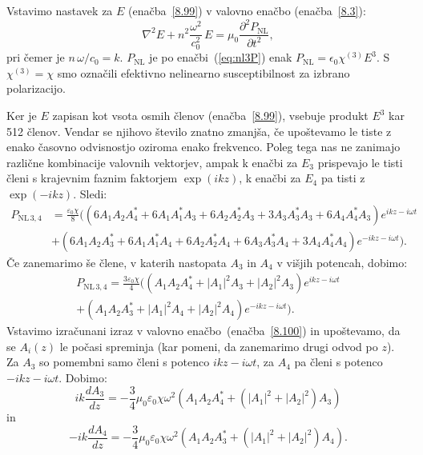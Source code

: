 Vstavimo nastavek za $E$ (enačba~\ref{8.99}) v valovno enačbo (enačba~\ref{8.3}):
\begin{equation}
\nabla^{2}E+n^2\frac{\omega^{2}}{c_0^{2}}\, 
E=\mu_{0}\frac{\partial^2 P_{\mathrm{NL}}}{\partial t^2},
\label{8.100}
\end{equation}
pri čemer je $n\,\omega/c_0=k$. $P_{\textrm{NL}}$ je po enačbi~(\ref{eq:nl3P})
enak $P_\mathrm{NL}= \epsilon_{0}\chi^{(3)}E^3$. S $\chi^{(3)} = \chi$ smo označili
efektivno nelinearno susceptibilnost
za izbrano polarizacijo. 

Ker je $E$ zapisan kot vsota osmih členov
(enačba~\ref{8.99}), vsebuje produkt $E^3$ kar 512 členov. Vendar se njihovo število znatno zmanjša, 
če upoštevamo le tiste z enako časovno odvisnostjo oziroma enako frekvenco.
Poleg tega nas ne zanimajo različne kombinacije valovnih vektorjev, ampak k enačbi za $E_{3}$ 
prispevajo le tisti členi s krajevnim faznim faktorjem $\exp(ikz)$, 
k enačbi za $E_4$ pa tisti z $\exp(-ikz)$. Sledi:
\begin{align}
P_{\mathrm{NL}\,3,4} &= \frac{\varepsilon_0\chi}{8} \big(
\left(6 A_1 A_2 A_4^*+ 6A_1 A_1^*A_3 + 6A_2A_2^*A_3 + 3 A_3A_3^*A_3 + 6 A_4 A_4^* A_3\right)
e^{i k z - i\omega t} \nonumber\\
&+
\left(6 A_1 A_2 A_3^*+6 A_1 A_1^*A_4 + 6A_2A_2^*A_4 + 6 A_3A_3^*A_4 + 3 A_4 A_4^* A_4\right)
e^{-i k z - i\omega t} \big).
\end{align}
Če zanemarimo še člene, v katerih nastopata $A_3$ in $A_4$ v višjih potencah, dobimo:
\begin{align}
P_{\mathrm{NL}\,3,4} = \frac{3\varepsilon_0\chi}{4} \big(
\left( A_1 A_2 A_4^*+ |A_1|^2 A_3 + |A_2|^2 A_3 \right)
e^{i k z - i\omega t} \nonumber\\
+ 
\left( A_1 A_2 A_3^*+|A_1|^2 A_4 + |A_2|^2A_4 \right)
e^{-i k z - i\omega t} \big).
\end{align}
Vstavimo izračunani izraz v valovno enačbo~(enačba~\ref{8.100}) in upoštevamo, 
da se $A_i(z)$ le počasi 
spreminja (kar pomeni, da zanemarimo drugi odvod po $z$). Za $A_3$ so pomembni 
samo členi s potenco $ikz-i\omega t$, za $A_4$ pa členi s potenco $-ikz-i\omega t$. Dobimo: 
\begin{equation}
i k \frac{dA_3}{dz} = - \frac{3}{4} \mu_0\varepsilon_0 \chi \omega^2 
\left( A_1 A_2 A_4^*+ (|A_1|^2 + |A_2|^2) A_3 \right)
\label{eq:opc1}
\end{equation}
in 
\begin{equation}
-i k \frac{dA_4}{dz} = - \frac{3}{4} \mu_0\varepsilon_0 \chi \omega^2 
\left( A_1 A_2 A_3^*+ (|A_1|^2 + |A_2|^2) A_4 \right)\!\!.
\label{eq:opc2}
\end{equation}
